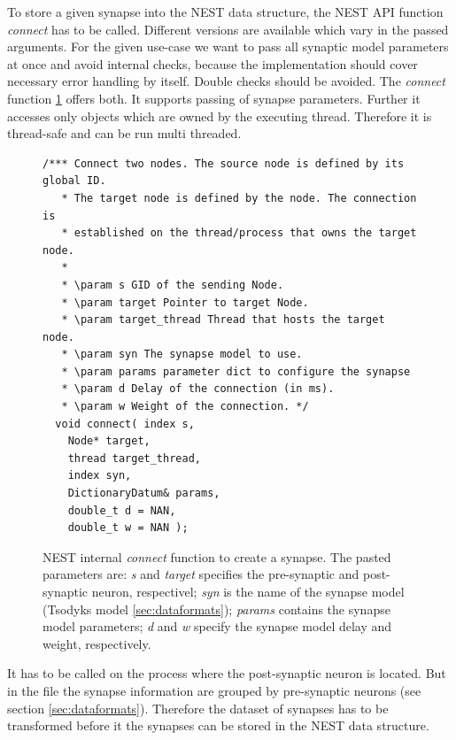 To store a given synapse into the NEST data structure,
the NEST API function \emph{connect} has to be called.  
Different versions are available which vary in the passed arguments.
For the given use-case we want to pass all synaptic model parameters at once and
avoid internal checks, because the implementation should cover necessary error handling by 
itself. Double checks should be avoided.
The \emph{connect} function \ref{code:connect} offers both.
It supports passing of synapse parameters.
Further it accesses only objects which are owned by the executing thread. 
Therefore it is thread-safe and can be run multi threaded.
\begin{figure}[ht!]
\begin{lstlisting}[style=cppcode]
/*** Connect two nodes. The source node is defined by its global ID.
   * The target node is defined by the node. The connection is
   * established on the thread/process that owns the target node.
   *
   * \param s GID of the sending Node.
   * \param target Pointer to target Node.
   * \param target_thread Thread that hosts the target node.
   * \param syn The synapse model to use.
   * \param params parameter dict to configure the synapse
   * \param d Delay of the connection (in ms).
   * \param w Weight of the connection. */
  void connect( index s,
    Node* target,
    thread target_thread,
    index syn,
    DictionaryDatum& params,
    double_t d = NAN,
    double_t w = NAN );
\end{lstlisting}
\caption{NEST internal \emph{connect} function to create a synapse. The pasted parameters are:
\emph{s} and \emph{target} specifies the pre-synaptic and post-synaptic neuron, respectivel;
\emph{syn} is the name of the synapse model (Tsodyks model \ref{sec:dataformats});
\emph{params} contains the synapse model parameters;
\emph{d} and \emph{w} specify the synapse model delay and weight, respectively.}
\label{code:connect}
\end{figure}
It has to be called on the process where the post-synaptic neuron is located.
But in the file the synapse information are grouped by pre-synaptic neurons (see section \ref{sec:dataformats}).
Therefore the dataset of synapses has to be transformed before it the synapses can be stored in the NEST data structure.

